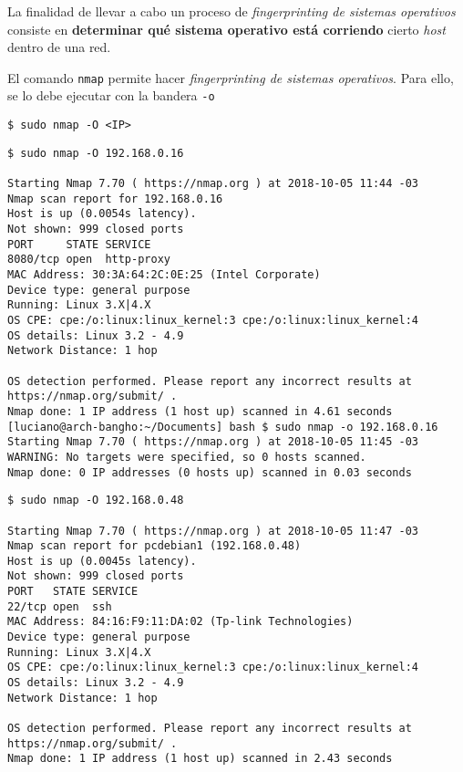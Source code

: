 La finalidad de llevar a cabo un proceso de \emph{fingerprinting de sistemas operativos} consiste en \textbf{determinar qué sistema operativo está corriendo} cierto \emph{host} dentro de una red.   

El comando \texttt{nmap} permite hacer \emph{fingerprinting de sistemas operativos}. Para ello, se lo debe ejecutar con la bandera \texttt{-o}   

\begin{lstlisting}[title={Se debe ejecutar el comando con privilegios de superusuario}]
$ sudo nmap -O <IP>
\end{lstlisting}

\begin{lstlisting}[title={\emph{OS Fingerprinting} a un Ubuntu 16.04}]
$ sudo nmap -O 192.168.0.16

Starting Nmap 7.70 ( https://nmap.org ) at 2018-10-05 11:44 -03
Nmap scan report for 192.168.0.16
Host is up (0.0054s latency).
Not shown: 999 closed ports
PORT     STATE SERVICE
8080/tcp open  http-proxy
MAC Address: 30:3A:64:2C:0E:25 (Intel Corporate)
Device type: general purpose
Running: Linux 3.X|4.X
OS CPE: cpe:/o:linux:linux_kernel:3 cpe:/o:linux:linux_kernel:4
OS details: Linux 3.2 - 4.9
Network Distance: 1 hop

OS detection performed. Please report any incorrect results at https://nmap.org/submit/ .
Nmap done: 1 IP address (1 host up) scanned in 4.61 seconds
[luciano@arch-bangho:~/Documents] bash $ sudo nmap -o 192.168.0.16
Starting Nmap 7.70 ( https://nmap.org ) at 2018-10-05 11:45 -03
WARNING: No targets were specified, so 0 hosts scanned.
Nmap done: 0 IP addresses (0 hosts up) scanned in 0.03 seconds
\end{lstlisting}

\begin{lstlisting}[title={\emph{OS Fingerprinting} a un Debian 9}]
$ sudo nmap -O 192.168.0.48

Starting Nmap 7.70 ( https://nmap.org ) at 2018-10-05 11:47 -03
Nmap scan report for pcdebian1 (192.168.0.48)
Host is up (0.0045s latency).
Not shown: 999 closed ports
PORT   STATE SERVICE
22/tcp open  ssh
MAC Address: 84:16:F9:11:DA:02 (Tp-link Technologies)
Device type: general purpose
Running: Linux 3.X|4.X
OS CPE: cpe:/o:linux:linux_kernel:3 cpe:/o:linux:linux_kernel:4
OS details: Linux 3.2 - 4.9
Network Distance: 1 hop

OS detection performed. Please report any incorrect results at https://nmap.org/submit/ .
Nmap done: 1 IP address (1 host up) scanned in 2.43 seconds
\end{lstlisting}

















\clearpage
\printbibliography


